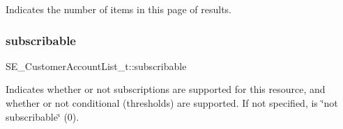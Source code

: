 Indicates the number of items in this page of results. \mbox{\label{group__CustomerAccountList_gaafec7bb1c828eb363b95a717027c419b}} 
\subsubsection{\texorpdfstring{subscribable}{subscribable}}
{\footnotesize\ttfamily S\+E\+\_\+\+Customer\+Account\+List\+\_\+t\+::subscribable}

Indicates whether or not subscriptions are supported for this resource, and whether or not conditional (thresholds) are supported. If not specified, is \char`\"{}not subscribable\char`\"{} (0). 